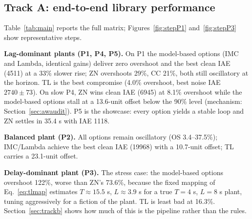 \documentclass[10pt,twocolumn]{article}
\begin{document}
\subsection{Track A: end-to-end library performance}

Table~\ref{tab:main} reports the full matrix; Figures~\ref{fig:stepP1} and~\ref{fig:stepP3} show representative steps.

\begin{table}[t]
\centering
\caption{Track A: end-to-end setpoint-step results (library defaults, Normal oscillation, $\lambda=0.5$ s). OS is overshoot, $t_r$ rise time, $t_s$ 2\%-band settling (``$>$1800'' right-censored), IAE over 1800 s, IAE$_{1\%}$ the mean over 20 noise seeds at 1\% of setpoint, and $|e|_\infty$ the observed steady-state offset. Gains are as emitted by the tuner.}
\label{tab:main}
\small
\setlength{\tabcolsep}{4pt}

\end{table}

\textbf{Lag-dominant plants (P1, P4, P5).} On P1 the model-based options (IMC and Lambda, identical gains) deliver zero overshoot and the best clean IAE (4511) at a 33\% slower rise; ZN overshoots 29\%, CC 21\%, both still oscillatory at the horizon. TL is the best compromise (4.0\% overshoot, best noise IAE $2740 \pm 73$). On slow P4, ZN wins clean IAE (6945) at 8.1\% overshoot while the model-based options stall at a 13.6-unit offset below the 90\% level (mechanism: Section~\ref{sec:awaudit}). P5 is the showcase: every option yields a stable loop and ZN settles in 35.4 s with IAE 1118.

\textbf{Balanced plant (P2).} All options remain oscillatory (OS 3.4--37.5\%); IMC/Lambda achieve the best clean IAE (19968) with a 10.7-unit offset; TL carries a 23.1-unit offset.

\textbf{Delay-dominant plant (P3).} The stress case: the model-based options overshoot 122\%, worse than ZN's 73.6\%, because the fixed mapping of Eq.~\eqref{eq:tlmap} estimates $T \approx 15.5$ s, $L \approx 3.9$ s for a true $T = 4$ s, $L = 8$ s plant, tuning aggressively for a fiction of the plant. TL is least bad at 16.3\%. Section~\ref{sec:trackb} shows how much of this is the pipeline rather than the rules.
\end{document}
